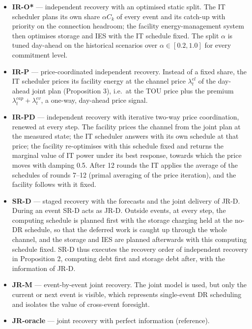 \documentclass[a4paper,twocolumn,fleqn,10pt]{article}
\providecommand{\tightlist}{\setlength{\itemsep}{0pt}\setlength{\parskip}{0pt}}
\begin{document}
\begin{itemize}
\tightlist
\item
  \textbf{IR-O*} --- independent recovery with an optimised static split. The IT scheduler plans its own share \(\alpha C_k\) of every event and its catch-up with priority on the connection headroom; the facility energy-management system then optimises storage and IES with the IT schedule fixed. The split \(\alpha\) is tuned day-ahead on the historical scenarios over \(\alpha\in[0.2,1.0]\) for every commitment level.
\item
  \textbf{IR-P} --- price-coordinated independent recovery. Instead of a fixed share, the IT scheduler prices its facility energy at the channel price \(\lambda^{el}_t\) of the day-ahead joint plan (Proposition 3), i.e.~at the TOU price plus the premium \(\lambda^{cap}_t+\lambda^{ev}_t\), a one-way, day-ahead price signal.
\item
  \textbf{IR-PD} --- independent recovery with iterative two-way price coordination, renewed at every step. The facility prices the channel from the joint plan at the measured state; the IT scheduler answers with its own schedule at that price; the facility re-optimises with this schedule fixed and returns the marginal value of IT power under its best response, towards which the price moves with damping 0.5. After 12 rounds the IT applies the average of the schedules of rounds 7--12 (primal averaging of the price iteration), and the facility follows with it fixed.
\item
  \textbf{SR-D} --- staged recovery with the forecasts and the joint delivery of JR-D. During an event SR-D acts as JR-D. Outside events, at every step, the computing schedule is planned first with the storage charging held at the no-DR schedule, so that the deferred work is caught up through the whole channel, and the storage and IES are planned afterwards with this computing schedule fixed. SR-D thus executes the recovery order of independent recovery in Proposition 2, computing debt first and storage debt after, with the information of JR-D.
\item
  \textbf{JR-M} --- event-by-event joint recovery. The joint model is used, but only the current or next event is visible, which represents single-event DR scheduling and isolates the value of cross-event foresight.
\item
  \textbf{JR-oracle} --- joint recovery with perfect information (reference).
\end{itemize}
\end{document}
